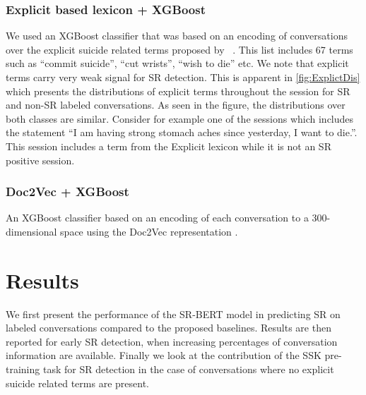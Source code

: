 \documentclass[letterpaper]{article} %
\begin{document}
  \subsubsection{Explicit based lexicon + XGBoost}
We used an XGBoost classifier that was based on an encoding  of conversations over the explicit suicide related terms proposed by ~\citet{amir}. This  list  includes 67 terms such as ``commit suicide'', ``cut wrists'', ``wish to die'' etc.
We note that explicit terms carry very weak signal for SR detection.  This is apparent in
\autoref{fig:ExplictDis} which presents the distributions of explicit terms throughout the session for SR and non-SR labeled  conversations. As seen in the figure, the distributions over both classes are similar.
Consider for example one of the sessions which includes the statement ``I am having strong stomach aches since yesterday, I want to die.''. This session includes a term from the Explicit lexicon while it is not an SR positive session.


\subsubsection{Doc2Vec + XGBoost}
An XGBoost classifier based on an encoding of each conversation to a 300-dimensional space using the Doc2Vec representation\cite{doc2vec} .

\section{Results}
We first present the performance of the SR-BERT model in predicting SR on labeled conversations compared to the proposed baselines.
Results are then reported for early SR detection, when increasing percentages of conversation information are available. Finally we look at the contribution of the SSK pre-training task for SR detection in the case of conversations where no explicit suicide related terms are present.
\end{document}

